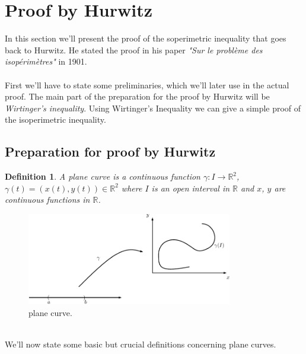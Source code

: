 \documentclass[12pt, a4paper, titlepage]{article}
\newtheorem{definition}{Definition}
\begin{document}

\newpage 
\section{Proof by Hurwitz}
In this section we'll present the proof of the soperimetric inequality that goes back to Hurwitz. He stated the proof in his paper \textit{"Sur le probl\`eme des isop\'erim\`etres"} in 1901. \\
\\
First we'll have to state some preliminaries, which we'll later use in the actual proof. The main part of the preparation for the proof by Hurwitz will be \textit{Wirtinger's inequality}. Using Wirtinger's Inequality we can give a simple proof of the isoperimetric inequality.

\subsection{Preparation for proof by Hurwitz}

\begin{definition}
A plane curve is a continuous function $\gamma: I \rightarrow \mathbb{R}^2$, $\gamma(t) = (x(t),y(t)) \in \mathbb{R}^2$ where $I$ is an open interval in $\mathbb{R}$ and $x$, $y$ are continuous functions in $\mathbb{R}$. 
\end{definition}
\begin{figure}[htbp] 
  \centering
     \includegraphics[width=0.8\textwidth]{images/curve.pdf}
  \caption{plane curve.}
  \label{fig:Bild2}
\end{figure}
\\
\noindent We'll now state some basic but crucial definitions concerning plane curves.
\end{document}
